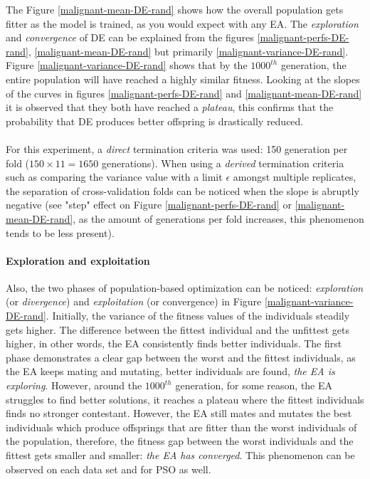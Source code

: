 \documentclass[a4paper,12pt, oneside]{memoir}
\begin{document}
The Figure \ref{malignant-mean-DE-rand} shows how the overall population gets fitter as the model is trained, as you would expect with any EA. The \textit{exploration} and \textit{convergence} of DE can be explained from the figures \ref{malignant-perfs-DE-rand}, \ref{malignant-mean-DE-rand} but primarily \ref{malignant-variance-DE-rand}. Figure \ref{malignant-variance-DE-rand} shows that by the $1000^{th}$ generation, the entire population will have reached a highly similar fitness. Looking at the slopes of the curves in figures \ref{malignant-perfs-DE-rand} and \ref{malignant-mean-DE-rand} it is observed that they both have reached a \textit{plateau}, this confirms that the probability that DE produces better offspring is drastically reduced.
\\ \\
For this experiment, a \textit{direct} termination criteria was used: 150 generation per fold ($150\times11=1650$ generations). When using a \textit{derived} termination criteria such as comparing the variance value with a limit $\epsilon$ amongst multiple replicates, the separation of cross-validation folds can be noticed when the slope is abruptly negative (see "step" effect on Figure \ref{malignant-perfs-DE-rand} or \ref{malignant-mean-DE-rand}, as the amount of generations per fold increases, this phenomenon tends to be less present). 

\paragraph{Exploration and exploitation}
Also, the two phases of population-based optimization can be noticed: \textit{exploration} (or \textit{divergence}) and \textit{exploitation} (or convergence) in Figure \ref{malignant-variance-DE-rand}. Initially, the variance of the fitness values of the individuals steadily gets higher. The difference between the fittest individual and the unfittest gets higher, in other words, the EA consistently finds better individuals. The first phase demonstrates a clear gap between the worst and the fittest individuals, as the EA keeps mating and mutating, better individuals are found, \textit{the EA is exploring}. However, around the $1000^{th}$ generation, for some reason, the EA struggles to find better solutions, it reaches a plateau where the fittest individuals finds no stronger contestant. However, the EA still mates and mutates the best individuals which produce offsprings that are fitter than the worst individuals of the population, therefore, the fitness gap between the worst individuals and the fittest gets smaller and smaller: \textit{the EA has converged}. This phenomenon can be observed on each data set and for PSO as well.
\end{document}
